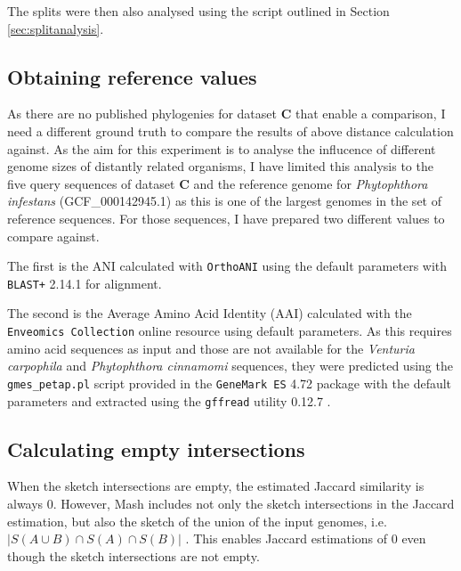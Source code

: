 The splits were then also analysed using the script outlined in Section
\ref{sec:splitanalysis}.

\subsection*{Obtaining reference values}
As there are no published phylogenies for dataset \textbf{C} that enable a
comparison, I
need a different ground truth to compare the results of above distance
calculation against. As the aim for this experiment is to analyse the influcence
of different genome sizes of distantly related organisms, I have limited this
analysis to the five query sequences of dataset \textbf{C} and the reference
genome for
\textit{Phytophthora infestans} (GCF\_000142945.1) as this is one of the largest
genomes in the set of reference sequences. For those sequences, I have prepared
two different values to compare against.

The first is the ANI calculated with \texttt{OrthoANI}
\cite{leeOrthoANIImprovedAlgorithm2016} using the default parameters with
\texttt{BLAST+} 2.14.1 \cite{camachoBLASTArchitectureApplications2009} for
alignment.

The second is the Average Amino Acid Identity (AAI)
\cite{konstantinidisGenomeBasedTaxonomyProkaryotes2005} calculated with the
\texttt{Enveomics Collection} online resource
\cite{rodriguez-rEnveomicsCollectionToolbox2016} using default parameters. As
this requires amino acid sequences as input and those are not available for the
\textit{Venturia carpophila} and \textit{Phytophthora cinnamomi} sequences, they
were predicted using the \texttt{gmes\_petap.pl} script provided in the
\texttt{GeneMark ES} 4.72 package \cite{lomsadzeGeneIdentificationNovel2005}
with the default parameters and extracted using the \texttt{gffread} utility
0.12.7 \cite{perteaGFFUtilitiesGffRead2020}.


\subsection*{Calculating empty intersections}
When the sketch intersections are empty, the estimated Jaccard similarity is
always 0. However, Mash includes not only the sketch intersections in the
Jaccard estimation, but also the sketch of the union of the input genomes, i.e.
$|S(A \cup B) \cap S(A) \cap S(B)|$ \cite{ondovMashFastGenome2016}. This enables
Jaccard estimations of 0 even though the sketch intersections are not empty.

